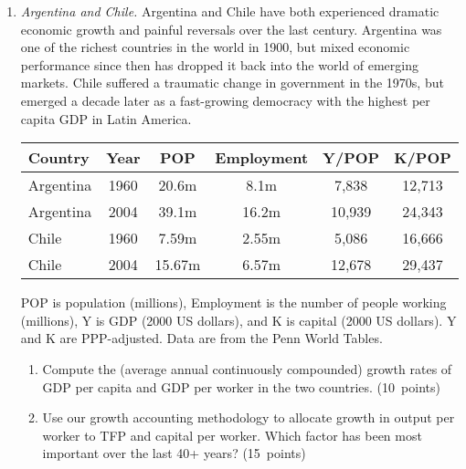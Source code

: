 \documentclass[letterpaper,12pt]{article}
\begin{document}
\begin{enumerate}
\begin{enumerate}
\end{enumerate}


\item {\it Argentina and Chile. } 
Argentina and Chile have both experienced dramatic economic growth
and painful reversals over the last century.  
Argentina was one of the richest countries in the world in 1900, 
but mixed economic performance since then has 
dropped it back into the world of emerging markets.  
Chile suffered a traumatic change in government in the 1970s, 
but emerged a decade later as a fast-growing democracy with 
the highest per capita GDP in Latin America.  
\begin{center}
\begin{tabular}{lccccc}
\hline\hline
Country   &  Year   &  POP   &  Employment &  Y/POP &  K/POP  \\
\hline\hline
Argentina \hspace*{0.1in} &  1960   &  20.6m &  \phantom{1}8.1m   
                &  \phantom{1}7,838  &  12,713  \\
Argentina &  2004   &  39.1m &  16.2m             &  10,939 &  24,343  \\
Chile   &  1960  & 7.59m &  2.55m   
                &  \phantom{1}5,086   &   16,666  \\
Chile     &  2004   & 15.67m\phantom{1} &  6.57m   &  12,678  &  29,437  \\
\hline\hline
\end{tabular}
\end{center}
POP is population (millions), Employment is the number of people working 
(millions), Y is GDP (2000 US dollars), 
and K is capital (2000 US dollars).  
Y and K are PPP-adjusted.  
Data are from the Penn World Tables.  


\begin{enumerate}
\item Compute the (average annual continuously compounded) 
growth rates of GDP per capita and GDP per worker in the two countries.  (10~points)

\item Use our growth accounting methodology to allocate growth in
output per worker to TFP and capital per worker.
Which factor has been most important over the last 40+ years? (15~points)


\end{enumerate}
\end{enumerate}
\end{document}
